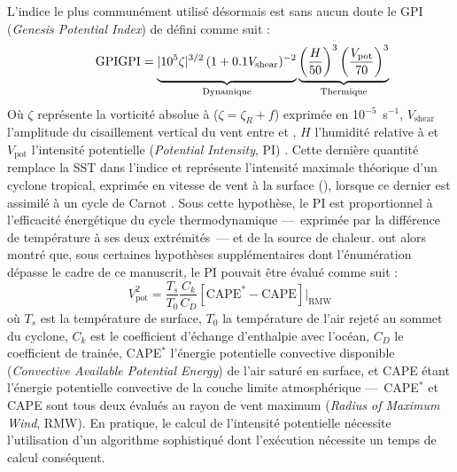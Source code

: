 \documentclass[../main.tex]{subfiles}
\begin{document}
L'indice le plus communément utilisé désormais est sans aucun doute le GPI (\textit{Genesis Potential Index}) de \textcite{emanuel_tropical_2004} défini comme suit :
%
\begin{equation*}
    \tag*{GPI}
    \mathrm{GPI} = \underbrace{\vphantom{\left( \frac{H}{50} \right)^3}\lvert 10^5 \zeta \rvert^{3/2} \, (1 + 0.1 V_{\mathrm{shear}})^{-2}}_{\mathrm{Dynamique}}
    \underbrace{\left( \frac{H}{50} \right)^3 \left( \frac{V_{\mathrm{pot}}}{70} \right)^3}_{\mathrm{Thermique}}
\end{equation*}
%
Où $\zeta$ représente la vorticité absolue à  ($\zeta = \zeta_R + f$) exprimée en 10$^{-5}$~s$^{-1}$, $V_{\mathrm{shear}}$ l'amplitude du cisaillement
vertical du vent entre  et , $H$ l'humidité relative à  et $V_{\mathrm{pot}}$ l'intensité potentielle (\textit{Potential Intensity},
PI) \parencite{emanuel_airsea_1986,emanuel_sensitivity_1995,bister_dissipative_1998,bister_low_2002}. Cette dernière quantité remplace la SST dans l'indice et
représente l'intensité maximale théorique d'un cyclone tropical, exprimée en vitesse de vent à la surface (\ms{}), lorsque ce dernier est assimilé à un cycle de
Carnot \parencite{emanuel_dependence_1987}. Sous cette hypothèse, le PI est proportionnel à l'efficacité énergétique du cycle thermodynamique ---~exprimée par la
différence de température à ses deux extrémités~--- et de la source de chaleur. \textcite{bister_low_2002} ont alors montré que, sous certaines hypothèses
supplémentaires dont l'énumération dépasse le cadre de ce manuscrit, le PI pouvait être évalué comme suit :
%
\begin{equation*}
    \tag*{PI}
    V_{\mathrm{pot}}^2 = \frac{T_s}{T_0} \frac{C_k}{C_D} \left[ \mathrm{CAPE}^* - \mathrm{CAPE} \right] \rvert_{\mathrm{RMW}}
\end{equation*}
%
où $T_s$ est la température de surface, $T_0$ la température de l'air rejeté au sommet du cyclone, $C_k$ est le coefficient d'échange d'enthalpie avec l'océan,
$C_D$ le coefficient de trainée, CAPE$^*$ l'énergie potentielle convective disponible (\textit{Convective Available Potential Energy}) de l'air saturé en surface,
et CAPE étant l'énergie potentielle convective de la couche limite atmosphérique ---~CAPE$^*$ et CAPE
sont tous deux évalués au rayon de vent maximum (\textit{Radius of Maximum Wind}, RMW). En pratique, le calcul de l'intensité potentielle nécessite
l'utilisation d'un algorithme sophistiqué dont l'exécution nécessite un temps de calcul conséquent.
\end{document}
